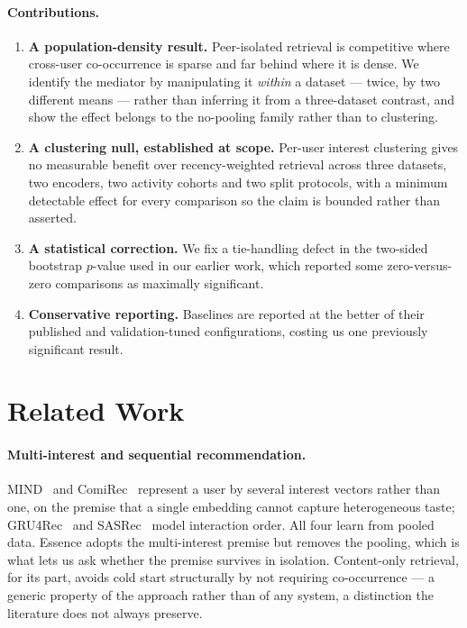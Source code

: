 \documentclass[runningheads]{llncs}
\begin{document}
\paragraph{Contributions.}
\begin{enumerate}
\item \textbf{A population-density result.} Peer-isolated retrieval is competitive where
cross-user co-occurrence is sparse and far behind where it is dense. We identify the
mediator by manipulating it \emph{within} a dataset --- twice, by two different means ---
rather than inferring it from a three-dataset contrast, and show the effect belongs to the
no-pooling family rather than to clustering.
\item \textbf{A clustering null, established at scope.} Per-user interest clustering gives
no measurable benefit over recency-weighted retrieval across three datasets, two encoders,
two activity cohorts and two split protocols, with a minimum detectable effect for every
comparison so the claim is bounded rather than asserted.
\item \textbf{A statistical correction.} We fix a tie-handling defect in the two-sided
bootstrap $p$-value used in our earlier work, which reported some zero-versus-zero
comparisons as maximally significant.
\item \textbf{Conservative reporting.} Baselines are reported at the better of their
published and validation-tuned configurations, costing us one previously significant
result.
\end{enumerate}

\section{Related Work}

\paragraph{Multi-interest and sequential recommendation.} MIND~\cite{li2019mind} and
ComiRec~\cite{cen2020controllable} represent a user by several interest vectors rather than
one, on the premise that a single embedding cannot capture heterogeneous taste;
GRU4Rec~\cite{hidasi2016session} and SASRec~\cite{kang2018self} model interaction order.
All four learn from pooled data. Essence adopts the multi-interest premise but removes the
pooling, which is what lets us ask whether the premise survives in isolation. Content-only
retrieval, for its part, avoids cold start structurally by not requiring co-occurrence --- a
generic property of the approach rather than of any system, a distinction the literature
does not always preserve.
\end{document}
